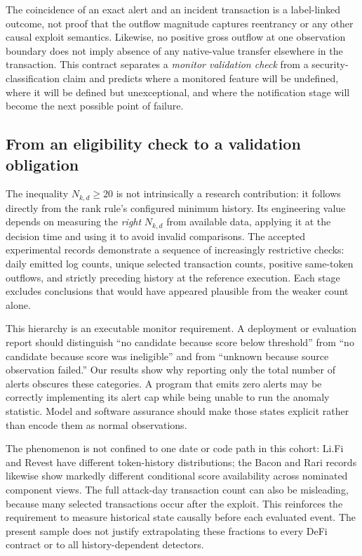 \documentclass[preprint,12pt,authoryear]{elsarticle}
\begin{document}
The coincidence of an exact alert and an incident transaction is a label-linked outcome, not proof that the outflow magnitude captures reentrancy or any other causal exploit semantics. Likewise, no positive gross outflow at one observation boundary does not imply absence of any native-value transfer elsewhere in the transaction. This contract separates a \emph{monitor validation check} from a security-classification claim and predicts where a monitored feature will be undefined, where it will be defined but unexceptional, and where the notification stage will become the next possible point of failure.

\subsection{From an eligibility check to a validation obligation}
The inequality $N_{k,d}\geq20$ is not intrinsically a research contribution: it follows directly from the rank rule's configured minimum history. Its engineering value depends on measuring the \emph{right} $N_{k,d}$ from available data, applying it at the decision time and using it to avoid invalid comparisons. The accepted experimental records demonstrate a sequence of increasingly restrictive checks: daily emitted log counts, unique selected transaction counts, positive same-token outflows, and strictly preceding history at the reference execution. Each stage excludes conclusions that would have appeared plausible from the weaker count alone.

This hierarchy is an executable monitor requirement. A deployment or evaluation report should distinguish ``no candidate because score below threshold'' from ``no candidate because score was ineligible'' and from ``unknown because source observation failed.'' Our results show why reporting only the total number of alerts obscures these categories. A program that emits zero alerts may be correctly implementing its alert cap while being unable to run the anomaly statistic. Model and software assurance should make those states explicit rather than encode them as normal observations.

The phenomenon is not confined to one date or code path in this cohort: Li.Fi and Revest have different token-history distributions; the Bacon and Rari records likewise show markedly different conditional score availability across nominated component views. The full attack-day transaction count can also be misleading, because many selected transactions occur after the exploit. This reinforces the requirement to measure historical state causally before each evaluated event. The present sample does not justify extrapolating these fractions to every DeFi contract or to all history-dependent detectors.
\end{document}
